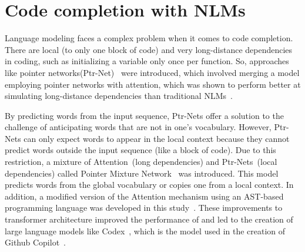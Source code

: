 \section{Code completion with NLMs}
Language modeling faces a complex problem when it comes to code completion. There are local (to only one block of code) and very long-distance dependencies in coding, such as initializing a variable only once per function. 
So, approaches like pointer networks(Ptr-Net)~\cite{pointer} were introduced, which involved merging a model employing pointer networks with attention, which was shown to perform better at simulating long-distance dependencies than traditional NLMs~\cite{ccnlm}.

By predicting words from the input sequence, Ptr-Nets offer a solution to the challenge of anticipating words that are not in one's vocabulary. However, Ptr-Nets can only expect words to appear in the local context because they cannot predict words outside the input sequence (like a block of code).
Due to this restriction, a mixture of Attention~(long dependencies) and Ptr-Nets~(local dependencies) called Pointer Mixture Network~\cite{ccnlm} was introduced. This model predicts words from the global vocabulary or copies one from a local context. 
In addition, a modified version of the Attention mechanism using an AST-based programming language was developed in this study~\cite{ccnlm}. These improvements to transformer architecture improved the performance of \cct{} and led to the creation of large language models like Codex~\cite{copilot}, which is the model used in the creation of Github Copilot~\cite{Copilot-web}.



